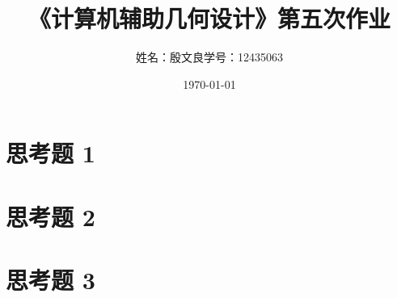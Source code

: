 \documentclass[utf8]{ctexart}
\title{《计算机辅助几何设计》第五次作业}
\author{姓名：殷文良\qquad 学号：12435063}
\date{\today}
\begin{document}
\maketitle
{}

\section*{思考题 1}

\section*{思考题 2}

\section*{思考题 3}
\end{document}
